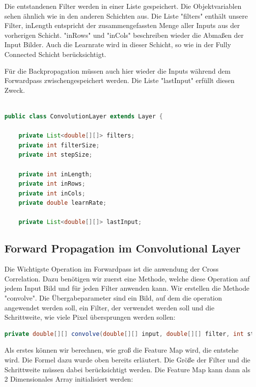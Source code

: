 \documentclass[12pt]{article}
\begin{document}
Die entstandenen Filter werden in einer Liste gespeichert. Die Objektvariablen sehen ähnlich wie in den anderen Schichten aus. Die Liste "filters" enthält unsere Filter, inLength entspricht der zusammengefassten Menge aller Inputs aus der vorherigen Schicht. "inRows" und "inCols" beschreiben wieder die Abmaßen der Input Bilder. Auch die Learnrate wird in dieser Schicht, so wie in der Fully Connected Schicht berücksichtigt.

Für die Backpropagation müssen auch hier wieder die Inputs während dem Forwardpass zwischengespeichert werden. Die Liste "lastInput" erfüllt diesen Zweck.

\begin{lstlisting}[language=Java]

public class ConvolutionLayer extends Layer {

    private List<double[][]> filters;
    private int filterSize;
    private int stepSize;

    private int inLength;
    private int inRows;
    private int inCols;
    private double learnRate;

    private List<double[][]> lastInput;

\end{lstlisting}


\subsection{Forward Propagation im Convolutional Layer}

Die Wichtigste Operation im Forwardpass ist die anwendung der Cross Correlation. Dazu benötigen wir zuerst eine Methode, welche diese Operation auf jedem Input Bild und für jeden Filter anwenden kann. 
Wir erstellen die Methode "convolve". Die Übergabeparameter sind ein Bild, auf dem die operation angewendet werden soll, ein Filter, der verwendet werden soll und die Schrittweite, wie viele Pixel übersprungen werden sollen:

\begin{lstlisting}[language=Java]
private double[][] convolve(double[][] input, double[][] filter, int stepSize) {
\end{lstlisting}

Als erstes können wir berechnen, wie groß die Feature Map wird, die entstehe wird. Die Formel dazu wurde oben bereits erläutert. Die Größe der Filter und die Schrittweite müssen dabei berücksichtigt werden. Die Feature Map kann dann als 2 Dimensionales Array initialisiert werden:
\end{document}
